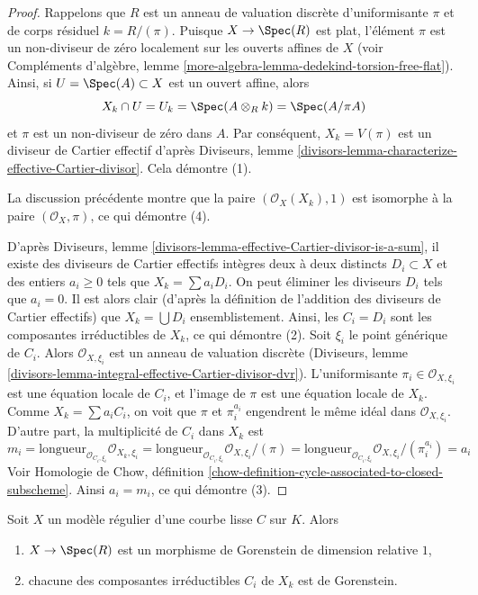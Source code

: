 \begin{proof}
Rappelons que $R$ est un anneau de valuation discrète d'uniformisante $\pi$
et de corps résiduel $k = R/(\pi)$. Puisque $X \to \Spec(R)$ est plat,
l'élément $\pi$ est un non-diviseur de zéro localement sur les ouverts affines de $X$
(voir Compléments d'algèbre, lemme
\ref{more-algebra-lemma-dedekind-torsion-free-flat}). Ainsi,
si $U = \Spec(A) \subset X$ est un ouvert affine, alors
$$
X_k \cap U = U_k = \Spec(A \otimes_R k) = \Spec(A/\pi A)
$$
et $\pi$ est un non-diviseur de zéro dans $A$.
Par conséquent, $X_k = V(\pi)$ est un diviseur de Cartier effectif d'après
Diviseurs, lemme \ref{divisors-lemma-characterize-effective-Cartier-divisor}.
Cela démontre (1).

\medskip\noindent
La discussion précédente montre que la paire $(\mathcal{O}_X(X_k), 1)$
est isomorphe à la paire $(\mathcal{O}_X, \pi)$, ce qui démontre (4).

\medskip\noindent
D'après Diviseurs, lemme \ref{divisors-lemma-effective-Cartier-divisor-is-a-sum},
il existe des diviseurs de Cartier effectifs intègres deux à deux distincts
$D_i \subset X$ et des entiers $a_i \geq 0$ tels que $X_k = \sum a_i D_i$.
On peut éliminer les diviseurs $D_i$ tels que $a_i = 0$. Il est alors
clair (d'après la définition de l'addition des diviseurs de Cartier
effectifs) que $X_k = \bigcup D_i$ ensemblistement. Ainsi, les $C_i = D_i$
sont les composantes irréductibles de $X_k$, ce qui démontre (2).
Soit $\xi_i$ le point générique de $C_i$.
Alors $\mathcal{O}_{X, \xi_i}$ est un anneau de valuation discrète
(Diviseurs, lemme \ref{divisors-lemma-integral-effective-Cartier-divisor-dvr}).
L'uniformisante $\pi_i \in \mathcal{O}_{X, \xi_i}$ est une équation locale
de $C_i$, et l'image de $\pi$ est une équation locale de $X_k$.
Comme $X_k = \sum a_i C_i$, on voit que $\pi$ et $\pi_i^{a_i}$
engendrent le même idéal dans $\mathcal{O}_{X, \xi_i}$.
D'autre part, la multiplicité de $C_i$ dans $X_k$ est
$$
m_i =
\text{longueur}_{\mathcal{O}_{C_i, \xi_i}} \mathcal{O}_{X_k, \xi_i} =
\text{longueur}_{\mathcal{O}_{C_i, \xi_i}} \mathcal{O}_{X, \xi_i}/(\pi) =
\text{longueur}_{\mathcal{O}_{C_i, \xi_i}} \mathcal{O}_{X, \xi_i}/(\pi_i^{a_i}) =
a_i
$$
Voir Homologie de Chow, définition
\ref{chow-definition-cycle-associated-to-closed-subscheme}.
Ainsi $a_i = m_i$, ce qui démontre (3).
\end{proof}

\begin{lemma}
\label{lemma-gorenstein}
Soit $X$ un modèle régulier d'une courbe lisse $C$ sur $K$. Alors
\begin{enumerate}
\item $X \to \Spec(R)$ est un morphisme de Gorenstein de dimension relative $1$,
\item chacune des composantes irréductibles $C_i$ de $X_k$ est de Gorenstein.
\end{enumerate}
\end{lemma}

